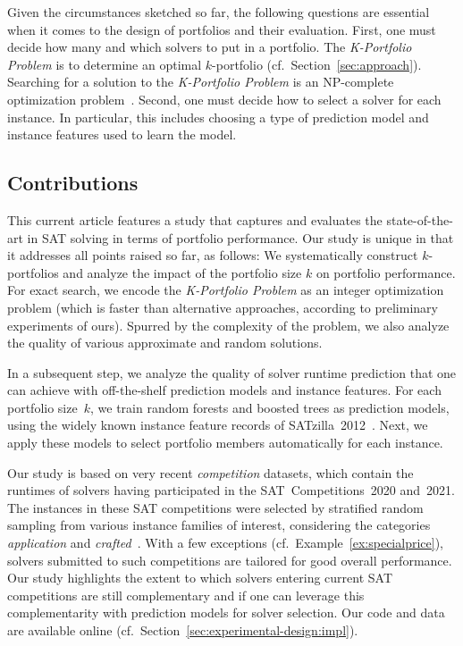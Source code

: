 \documentclass[a4paper,USenglish,pdfa]{lipics-v2021} %
\begin{document}
Given the circumstances sketched so far, the following questions are essential when it comes to the design of portfolios and their evaluation. 
First, one must decide how many and which solvers to put in a portfolio. 
The \emph{K-Portfolio Problem} is to determine an optimal $k$-portfolio (cf.~Section~\ref{sec:approach}). 
Searching for a solution to the \emph{K-Portfolio Problem} is an NP-complete optimization problem~\cite{nof2020real}. 
Second, one must decide how to select a solver for each instance. 
In particular, this includes choosing a type of prediction model and instance features used to learn the model. 

\subsection{Contributions}

This current article features a study that captures and evaluates the state-of-the-art in SAT solving in terms of portfolio performance. 
Our study is unique in that it addresses all points raised so far, as follows:
We systematically construct $k$-portfolios and analyze the impact of the portfolio size $k$ on portfolio performance. 
For exact search, we encode the \emph{K-Portfolio Problem} as an integer optimization problem (which is faster than alternative approaches, according to preliminary experiments of ours). 
Spurred by the complexity of the problem, we also analyze the quality of various approximate and random solutions. 

In a subsequent step, we analyze the quality of solver runtime prediction that one can achieve with off-the-shelf prediction models and instance features.
For each portfolio size~$k$, we train random forests and boosted trees as prediction models, using the widely known instance feature records of SATzilla~2012~\cite{xu2012satzilla2012}.
Next, we apply these models to select portfolio members automatically for each instance. 

Our study is based on very recent \emph{competition} datasets, which contain the runtimes of solvers having participated in the SAT~Competitions~2020 and~2021. 
The instances in these SAT competitions were selected by stratified random sampling from various instance families of interest, considering the categories \emph{application} and \emph{crafted}~\cite{SC2020:AIJ}.
With a few exceptions (cf.~Example~\ref{ex:specialprice}), solvers submitted to such competitions are tailored for good overall performance.
Our study highlights the extent to which solvers entering current SAT competitions are still complementary and if one can leverage this complementarity with prediction models for solver selection.
Our code and data are available online (cf.~Section~\ref{sec:experimental-design:impl}).
\end{document}
